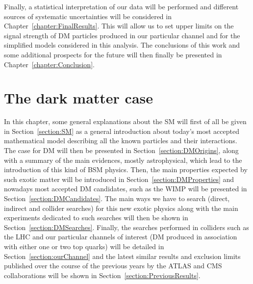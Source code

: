 \documentclass[a4paper, 10pt, openright]{report}
\begin{document}
Finally, a statistical interpretation of our data will be performed and different sources of systematic uncertainties will be considered in Chapter~\ref{chapter:FinalResults}. This will allow us to set upper limits on the signal strength of \ac{DM} particles produced in our particular channel and for the simplified models considered in this analysis. The conclusions of this work and some additional prospects for the future will then finally be presented in Chapter~\ref{chapter:Conclusion}.


\clearpage
\thispagestyle{empty}
\phantom{a}
\vfill
\newpage




































\chapter{The dark matter case}\label{chapter:Case}

In this chapter, some general explanations about the \ac{SM} will first of all be given in Section~\ref{section:SM} as a general introduction about today's most accepted mathematical model describing all the known particles and their interactions. The case for \ac{DM} will then be presented in Section~\ref{section:DMOrigins}, along with a summary of the main evidences, mostly astrophysical, which lead to the introduction of this kind of \acf{BSM} physics. Then, the main properties expected by such exotic matter will be introduced in Section~\ref{section:DMProperties} and nowadays most accepted \ac{DM} candidates, such as the \acf{WIMP} will be presented in Section~\ref{section:DMCandidates}. The main ways we have to search (direct, indirect and collider searches) for this new exotic physics along with the main experiments dedicated to such searches will then be shown in Section~\ref{section:DMSearches}. Finally, the searches performed in colliders such as the \ac{LHC} and our particular channels of interest (\ac{DM} produced in association with either one or two top quarks) will be detailed in Section~\ref{section:ourChannel} and the latest similar results and exclusion limits published over the course of the previous years by the \ac{ATLAS} and \ac{CMS} collaborations will be shown in Section~\ref{section:PreviousResults}.
\end{document}
